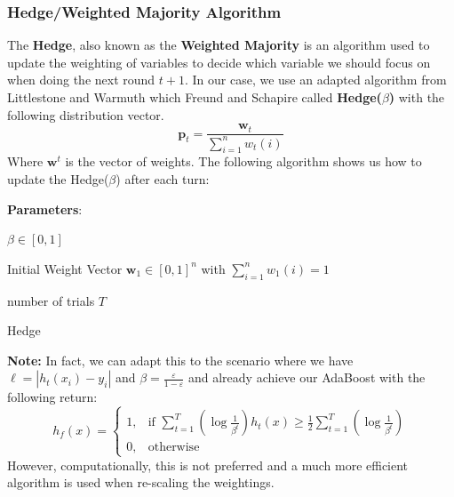 \documentclass[11pt,a4paper]{report}
\begin{document}
\subsubsection{Hedge/Weighted Majority Algorithm}
The \textbf{Hedge}, also known as the \textbf{Weighted Majority} \cite{wma} is an algorithm used to update the weighting of variables to decide which variable we should focus on when doing the next round $t + 1$. 
In our case, we use an adapted algorithm from Littlestone and Warmuth which Freund and Schapire called \textbf{Hedge($\beta$)} with the following distribution vector.
\begin{equation}
   \textbf{p}_t = \frac{\textbf{w}_t}{\sum_{i=1}^{n} w_t (i) } 
\end{equation}
Where $\textbf{w}^t$ is the vector of weights.
The following algorithm shows us how to update the Hedge($\beta$) after each turn:

\begin{algorithm}
\SetAlgoLined
\textbf{Parameters}:
\begin{description}
    \item $\beta \in [0,1]$
    \item Initial Weight Vector $\textbf{w}_1 \in [0,1]^n$ with $\sum_{i=1}^{n} w_1 (i) = 1$
    \item number of trials $T$
\end{description}
\caption{Hedge}
\end{algorithm}
\textbf{Note:} In fact, we can adapt this to the scenario where we have $\ell = \left|h_t(x_i) - y_i \right|$ and $\beta = \frac{\varepsilon}{1 - \varepsilon}$ and already achieve our AdaBoost with the following return:
\[
h_f (x) = 
\begin{cases}
1, & \text{if } \sum_{t=1}^T \left(\log \frac{1}{\beta^t} \right) h_t (x) \geq \frac{1}{2} \sum_{t=1}^T \left(\log \frac{1}{\beta^t} \right) \\
0, & \text{otherwise}
\end{cases}
\]
However, computationally, this is not preferred and a much more efficient algorithm is used when re-scaling the weightings.
\end{document}

